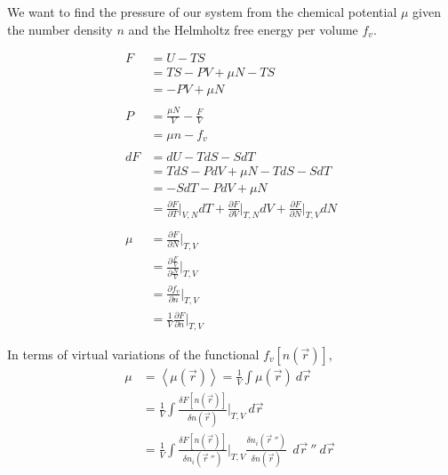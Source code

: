 \documentclass[double,12pt]{beavtex}
\begin{document}
We want to find the pressure of our system from the chemical potential 
$\mu$ given the number density $n$ and the Helmholtz free energy per 
volume $f_v$. 

\begin{align}
	F &= U - TS  \\
	  &= TS -PV + \mu N - TS  \\
	  &= -PV + \mu N  \\ \nonumber\\
%
	P &= \frac{\mu N}{V} - \frac{F}{V} \\
	  &= \mu n - f_v   \\ \nonumber\\
%
	dF &= dU - TdS -SdT \\
	   &= TdS - PdV + \mu N  - TdS -SdT\\
	   &=  -SdT - PdV + \mu N \\
	   &= \frac{\partial F}{\partial T}\bigg|_{V,N}dT 
	       + \frac{\partial F}{\partial V}\bigg|_{T,N}dV 
	       + \frac{\partial F}{\partial N}\bigg|_{T,V}dN \\ \nonumber\\
%
    \mu &= \frac{\partial F}{\partial N}\bigg|_{T,V} \\
        &= \frac{\partial \frac{F}{V}}{\partial \frac{N}{V}}\bigg|_{T,V}\\
        &= \frac{\partial f_v}{\partial n}\bigg|_{T,V} \\
        &= \frac{1}{V}\frac{\partial F}{\partial n}\bigg|_{T,V}        
\end{align}

In terms of virtual variations of the functional $f_v[n(\vec r)]$, 
\begin{align}
    \mu &= \left<\mu(\vec r)\right> = \frac{1}{V} \int \mu(\vec r)~d\vec r~    \\
        &= \frac{1}{V} \int \frac{\delta F[n(\vec r)]}{\delta n(\vec r)}
           \bigg|_{T,V}~d\vec r~  \\
        &= \frac{1}{V} \int \frac{\delta F[n(\vec r)]}{\delta n_i(\vec r~'')}
    \bigg|_{T,V} \frac{\delta n_i(\vec r~'')}{\delta n(\vec r)}~~d\vec r~'' 
         ~d\vec r~    
\end{align}
\end{document}
